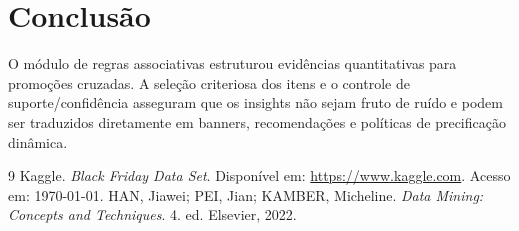 ﻿\documentclass[12pt]{article}
\begin{document}
\section{Conclusão}
O módulo de regras associativas estruturou evidências quantitativas para promoções cruzadas. A seleção criteriosa dos itens e o controle de suporte/confidência asseguram que os insights não sejam fruto de ruído e podem ser traduzidos diretamente em banners, recomendações e políticas de precificação dinâmica.

\begin{thebibliography}{9}
 Kaggle. \emph{Black Friday Data Set}. Disponível em: \url{https://www.kaggle.com}. Acesso em: \today.
 HAN, Jiawei; PEI, Jian; KAMBER, Micheline. \emph{Data Mining: Concepts and Techniques}. 4. ed. Elsevier, 2022.
\end{thebibliography}
\end{document}
